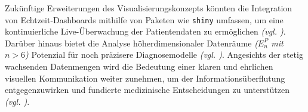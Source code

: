 Zukünftige Erweiterungen des Visualisierungskonzepts könnten die Integration von Echtzeit-Dashboards mithilfe von Paketen wie \texttt{shiny} umfassen, um eine kontinuierliche Live-Überwachung der Patientendaten zu ermöglichen \textit{(\acs{vgl.} \cite[49]{3})}. Darüber hinaus bietet die Analyse höherdimensionaler Datenräume \textit{(\(E_n^P\) mit \(n > 6\))} Potenzial für noch präzisere Diagnosemodelle \textit{(\acs{vgl.} \cite[33]{1})}. Angesichts der stetig wachsenden Datenmengen wird die Bedeutung einer klaren und ehrlichen visuellen Kommunikation weiter zunehmen, um der Informationsüberflutung entgegenzuwirken und fundierte medizinische Entscheidungen zu unterstützen \textit{(\acs{vgl.} \cite[43, 52]{2})}.

